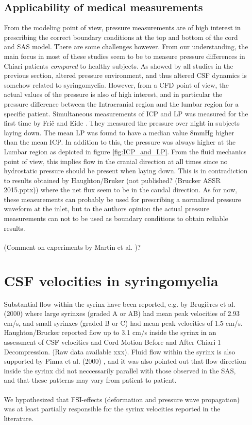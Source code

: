 \subsection{Applicability of medical measurements} \label{sec:AppMed}
From the modeling point of view, pressure measurements are of high interest in prescribing the correct boundary conditions at the top and bottom of the cord and SAS model. There are some challenges however. From our understanding, the main focus in most of these studies seem to be to measure pressure differences in Chiari patients \textit{compared} to healthy subjects. As showed by all studies in the previous section, altered pressure environment, and thus altered CSF dynamics is somehow related to syringomyelia. However, from a CFD point of view, the actual values of the pressure is also of high interest, and in particular the pressure difference between the Intracranial region and the lumbar region for a specific patient. Simultaneous measurements of ICP and LP was measured for the first time by Fri{\v{c}} and Eide \cite{Fric15}. They measured the pressure over night in subjects laying down. The mean LP was found to have a median value 8mmHg higher than the mean ICP. In addition to this, the pressure was always higher at the Lumbar region as depicted in figure \ref{fig:ICP_and_LP}. From the fluid mechanics point of view, this implies flow in the cranial direction at all times since no hydrostatic pressure should be present when laying down. This is in contradiction to results obtained by Haughton/Bruker (not published? (Brucker ASSR 2015.pptx)) where the net flux seem to be in the caudal direction. As for now, these measurements can probably be used for prescribing a normalized pressure waveform at the inlet, but to the authors opinion the actual pressure measurements can not to be used as boundary conditions to obtain reliable results. 
\\
\\
(Comment on experiments by Martin et al. \cite{Mart09Syrinx})?


\section{CSF velocities in syringomyelia}
Substantial flow within the syrinx have been reported, e.g. by Brugi{\`e}res et al. (2000) \cite{Brug00} where large syrinxes (graded A or AB) had mean peak velocities of 2.93 cm/s, and small syrinxes (graded B or C) had mean peak velocities of 1.5 cm/s. Haughton/Brucker reported flow up to 3.1 cm/s inside the syrinx in an assessment of CSF velocities and Cord Motion Before and After Chiari 1 Decompression. (Raw data available xxx). Fluid flow within the syrinx is also supported by Pinna et al. (2000) \cite{Pinn00}, and it was also pointed out that flow direction inside the syrinx did not neccessarily parallel with those observed in the SAS, and that these patterns may vary from patient to patient. 
\\
\\
We hypothesized that FSI-effects (deformation and pressure wave propagation) was at least partially responsible for the syrinx velocities reported in the literature.

